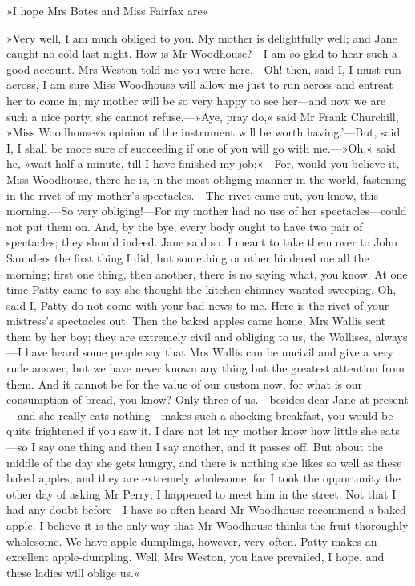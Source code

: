 »I hope Mrs Bates and Miss Fairfax are\longdash«

»Very well, I am much obliged to you. My mother is delightfully well; and Jane caught no cold last night. How is Mr Woodhouse?—I am so glad to hear such a good account. Mrs Weston told me you were here.—Oh! then, said I, I must run across, I am sure Miss Woodhouse will allow me just to run across and entreat her to come in; my mother will be so very happy to see her—and now we are such a nice party, she cannot refuse.—»Aye, pray do,« said Mr Frank Churchill, »Miss Woodhouse«s opinion of the instrument will be worth having.'—But, said I, I shall be more sure of succeeding if one of you will go with me.—»Oh,« said he, »wait half a minute, till I have finished my job;«—For, would you believe it, Miss Woodhouse, there he is, in the most obliging manner in the world, fastening in the rivet of my mother's spectacles.—The rivet came out, you know, this morning.—So very obliging!—For my mother had no use of her spectacles—could not put them on. And, by the bye, every body ought to have two pair of spectacles; they should indeed. Jane said so. I meant to take them over to John Saunders the first thing I did, but something or other hindered me all the morning; first one thing, then another, there is no saying what, you know. At one time Patty came to say she thought the kitchen chimney wanted sweeping. Oh, said I, Patty do not come with your bad news to me. Here is the rivet of your mistress's spectacles out. Then the baked apples came home, Mrs Wallis sent them by her boy; they are extremely civil and obliging to us, the Wallises, always—I have heard some people say that Mrs Wallis can be uncivil and give a very rude answer, but we have never known any thing but the greatest attention from them. And it cannot be for the value of our custom now, for what is our consumption of bread, you know? Only three of us.—besides dear Jane at present—and she really eats nothing—makes such a shocking breakfast, you would be quite frightened if you saw it. I dare not let my mother know how little she eats—so I say one thing and then I say another, and it passes off. But about the middle of the day she gets hungry, and there is nothing she likes so well as these baked apples, and they are extremely wholesome, for I took the opportunity the other day of asking Mr Perry; I happened to meet him in the street. Not that I had any doubt before—I have so often heard Mr Woodhouse recommend a baked apple. I believe it is the only way that Mr Woodhouse thinks the fruit thoroughly wholesome. We have apple-dumplings, however, very often. Patty makes an excellent apple-dumpling. Well, Mrs Weston, you have prevailed, I hope, and these ladies will oblige us.«

